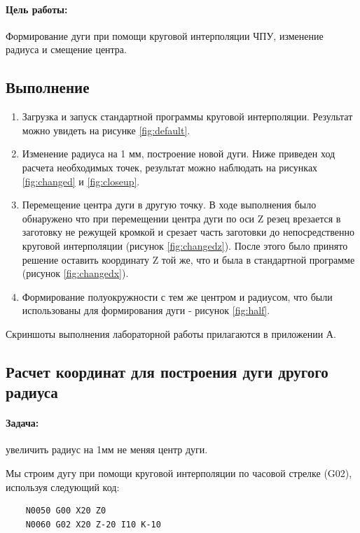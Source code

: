 \paragraph{Цель работы:} Формирование дуги при помощи круговой интерполяции ЧПУ, изменение радиуса и смещение центра.

\subsection*{Выполнение}

\begin{enumerate}
    \item Загрузка и запуск стандартной программы круговой интерполяции. Результат можно увидеть на рисунке \ref{fig:default}.
    \item Изменение радиуса на 1 мм, построение новой дуги. Ниже приведен ход расчета необходимых точек, результат можно наблюдать на рисунках \ref{fig:changed} и \ref{fig:closeup}.
    \item Перемещение центра дуги в другую точку. В ходе выполнения было обнаружено что при перемещении центра дуги по оси Z резец врезается в заготовку не режущей кромкой и срезает часть заготовки до непосредственно круговой интерполяции (рисунок \ref{fig:changedz}). После этого было принято решение оставить координату Z той же, что и была в стандартной программе (рисунок \ref{fig:changedx}).
    \item Формирование полуокружности с тем же центром и радиусом, что были использованы для формирования дуги - рисунок \ref{fig:half}.
\end{enumerate}

Скриншоты выполнения лабораторной работы прилагаются в приложении А.

\subsection*{Расчет координат для построения дуги другого радиуса}

\paragraph{Задача:} увеличить радиус на 1мм не меняя центр дуги.

Мы строим дугу при помощи круговой интерполяции по часовой стрелке (G02), используя следующий код:

\begin{verbatim}
	N0050 G00 X20 Z0
	N0060 G02 X20 Z-20 I10 K-10
\end{verbatim}

